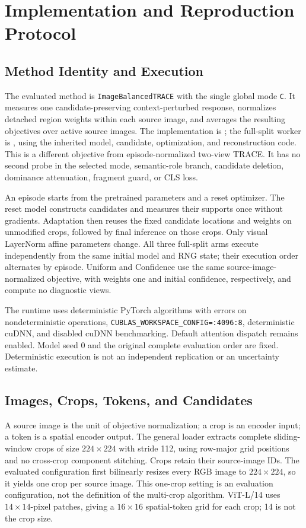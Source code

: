 \section{Implementation and Reproduction Protocol}
\label{app:protocol}
\subsection{Method Identity and Execution}
The evaluated method is \texttt{ImageBalancedTRACE} with the single global mode \texttt{C}. It measures one candidate-preserving context-perturbed response, normalizes detached region weights within each source image, and averages the resulting objectives over active source images. The implementation is ; the full-split worker is , using the inherited model, candidate, optimization, and reconstruction code. This is a different objective from episode-normalized two-view TRACE. It has no second probe in the selected mode, semantic-role branch, candidate deletion, dominance attenuation, fragment guard, or CLS loss.

An episode starts from the pretrained parameters and a reset optimizer. The reset model constructs candidates and measures their supports once without gradients. Adaptation then reuses the fixed candidate locations and weights on unmodified crops, followed by final inference on those crops. Only visual LayerNorm affine parameters change. All three full-split arms execute independently from the same initial model and RNG state; their execution order alternates by episode. Uniform and Confidence use the same source-image-normalized objective, with weights one and initial confidence, respectively, and compute no diagnostic views.

The runtime uses deterministic PyTorch algorithms with errors on nondeterministic operations, \texttt{CUBLAS\_WORKSPACE\_CONFIG=:4096:8}, deterministic cuDNN, and disabled cuDNN benchmarking. Default attention dispatch remains enabled. Model seed 0 and the original complete evaluation order are fixed. Deterministic execution is not an independent replication or an uncertainty estimate.

\subsection{Images, Crops, Tokens, and Candidates}
A source image is the unit of objective normalization; a crop is an encoder input; a token is a spatial encoder output. The general loader extracts complete sliding-window crops of size $224\times224$ with stride 112, using row-major grid positions and no cross-crop component stitching. Crops retain their source-image IDs. The evaluated configuration first bilinearly resizes every RGB image to $224\times224$, so it yields one crop per source image. This one-crop setting is an evaluation configuration, not the definition of the multi-crop algorithm. ViT-L/14 uses $14\times14$-pixel patches, giving a $16\times16$ spatial-token grid for each crop; 14 is not the crop size.

